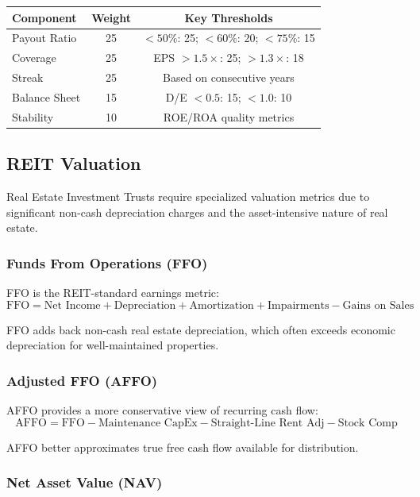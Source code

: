 \begin{center}
\begin{tabular}{lcc}
\textbf{Component} & \textbf{Weight} & \textbf{Key Thresholds} \\
\hline
Payout Ratio & 25 & $< 50\%$: 25; $< 60\%$: 20; $< 75\%$: 15 \\
Coverage & 25 & EPS $> 1.5\times$: 25; $> 1.3\times$: 18 \\
Streak & 25 & Based on consecutive years \\
Balance Sheet & 15 & D/E $< 0.5$: 15; $< 1.0$: 10 \\
Stability & 10 & ROE/ROA quality metrics \\
\end{tabular}
\end{center}

\newpage\subsection{REIT Valuation}

Real Estate Investment Trusts require specialized valuation metrics due to significant non-cash depreciation charges and the asset-intensive nature of real estate.

\subsubsection{Funds From Operations (FFO)}

FFO is the REIT-standard earnings metric:
\[
\text{FFO} = \text{Net Income} + \text{Depreciation} + \text{Amortization} + \text{Impairments} - \text{Gains on Sales}
\]

FFO adds back non-cash real estate depreciation, which often exceeds economic depreciation for well-maintained properties.

\subsubsection{Adjusted FFO (AFFO)}

AFFO provides a more conservative view of recurring cash flow:
\[
\text{AFFO} = \text{FFO} - \text{Maintenance CapEx} - \text{Straight-Line Rent Adj} - \text{Stock Comp}
\]

AFFO better approximates true free cash flow available for distribution.

\subsubsection{Net Asset Value (NAV)}


